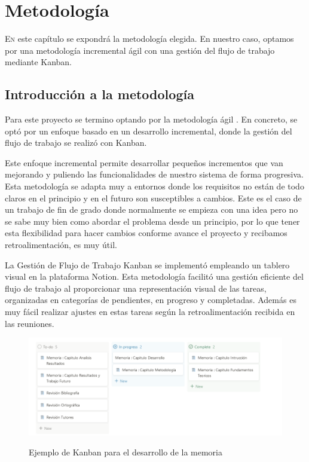 \chapter{Metodología}
\label{chap:metodologia}

\lettrine{E}{n} este capítulo se expondrá la metodología elegida. En nuestro caso, optamos por una metodología incremental ágil con una gestión del flujo de trabajo mediante Kanban.

\section{Introducción a la metodología}

Para este proyecto se termino optando por la metodología ágil \cite{scrum}. En concreto, se optó por un enfoque basado en un desarrollo incremental, donde la gestión del flujo de trabajo se realizó con Kanban.


Este enfoque incremental permite desarrollar pequeños incrementos que van mejorando y puliendo las funcionalidades de nuestro sistema de forma progresiva. Esta metodología se adapta muy a entornos donde los requisitos no están de todo claros en el principio y en el futuro son susceptibles a cambios. Este es el caso de un trabajo de fin de grado donde normalmente se empieza con una idea pero no se sabe muy bien como abordar el problema desde un principio, por lo que tener esta flexibilidad para hacer cambios conforme avance el proyecto y recibamos retroalimentación, es muy útil. 

La Gestión de Flujo de Trabajo Kanban se implementó empleando un tablero visual en la plataforma Notion. Esta metodología facilitó una gestión eficiente del flujo de trabajo al proporcionar una representación visual de las tareas, organizadas en categorías de pendientes, en progreso y completadas. Además es muy fácil realizar ajustes en estas tareas según la retroalimentación recibida en las reuniones.


\begin{figure}[h]
\centering
\includegraphics[width=14cm]{imaxes/kanban.png}
\label{fig:pointnetc}
\caption{Ejemplo de Kanban para el desarrollo de la memoria}
\end{figure}


